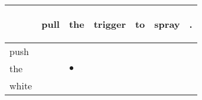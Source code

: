\documentclass[landscape]{article}
\newcommand{\ssp}{\hspace{2pt}}
\newcommand{\mex}{\cellcolor{g}$\bullet$}
\begin{document}
\noindent\begin{tabular}{|l|p{10pt}|p{10pt}|p{10pt}|p{10pt}|p{10pt}|p{10pt}|}
\hline
&\begin{sideways}\cellcolor{ref0}pull\hspace{12pt}\end{sideways}&\begin{sideways}\cellcolor{ref1}the\hspace{12pt}\end{sideways}&\begin{sideways}\cellcolor{ref2}trigger\hspace{12pt}\end{sideways}&\begin{sideways}\cellcolor{ref3}to\hspace{12pt}\end{sideways}&\begin{sideways}\cellcolor{ref4}spray\hspace{12pt}\end{sideways}&\begin{sideways}\cellcolor{ref5}.\hspace{12pt}\end{sideways}\\
\hline
\ssp push \ssp&\hspace{2pt}&\hspace{2pt}&\hspace{2pt}&\hspace{2pt}&\hspace{2pt}&\hspace{2pt}\\
\hline
\ssp \cellcolor{ref1}the \ssp&\hspace{2pt}&\hspace{2pt}\mex&\hspace{2pt}&\hspace{2pt}&\hspace{2pt}&\hspace{2pt}\\
\hline
\ssp white \ssp&\hspace{2pt}&\hspace{2pt}&\hspace{2pt}&\hspace{2pt}&\hspace{2pt}&\hspace{2pt}\\

\end{tabular}
\end{document}
